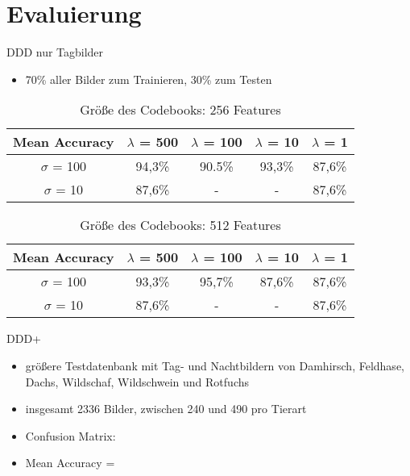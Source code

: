 \section{Evaluierung}
\begin{frame}[t,fragile]{DDD nur Tagbilder}
\begin{itemize}
	\item 70\% aller Bilder zum Trainieren, 30\% zum Testen
\end{itemize}
	\begin{table}
		\begin{tabular}{|c||c|c|c|c|}
			\hline
			Mean Accuracy & $\lambda$ = 500 & $\lambda$ = 100 & $\lambda$ = 10 & $\lambda$ = 1 \\
			\hline
			$\sigma$ = 100 & 94,3\% & 90.5\% & 93,3\% & 87,6\% \\ 
			\hline
			$\sigma$ = 10 & 87,6\% & - & - & 87,6\% \\
			\hline
		\end{tabular}
	\caption{Größe des Codebooks: 256 Features}
	\end{table}
		\begin{table}
		\begin{tabular}{|c||c|c|c|c|}
			\hline
			Mean Accuracy & $\lambda$ = 500 & $\lambda$ = 100 & $\lambda$ = 10 & $\lambda$ = 1 \\
			\hline
			$\sigma$ = 100 & 93,3\% & 95,7\% & 87,6\% & 87,6\% \\ 
			\hline
			$\sigma$ = 10 & 87,6\% & - & - & 87,6\% \\
			\hline
		\end{tabular}
		\caption{Größe des Codebooks: 512 Features}
	\end{table}
\end{frame}

\begin{frame}[t, fragile]{DDD+}
	\begin{itemize}
		\item größere Testdatenbank mit Tag- und Nachtbildern von Damhirsch, Feldhase, Dachs, Wildschaf, Wildschwein und Rotfuchs
		\item insgesamt 2336 Bilder, zwischen 240 und 490 pro Tierart
		\item Confusion Matrix:
		\item Mean Accuracy = 
	\end{itemize}
\end{frame}
